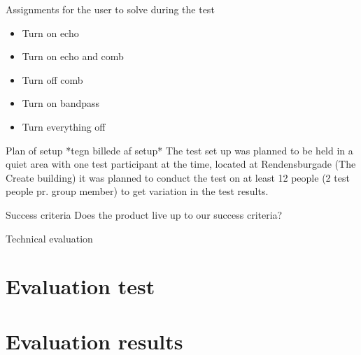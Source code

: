 Assignments for the user to solve during the test 
\begin{itemize}
\item Turn on echo
\item Turn on echo and comb
\item Turn off comb
\item Turn on bandpass 
\item Turn everything off
\end{itemize}

Plan of setup *tegn billede af setup*
The test set up was planned to be held in a quiet area with one test participant at the time, located at Rendensburgade (The Create building) it was planned to conduct the test on at least 12 people (2 test people pr. group member) to get variation in the test results. 

Success criteria 
Does the product live up to our success criteria?

Technical evaluation 



\section{Evaluation test}


\section{Evaluation results}